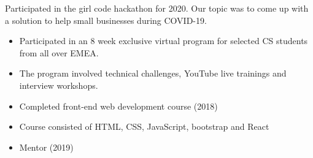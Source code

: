 \documentclass[10pt,a4paper,ragged2e,withhyper]{altacv}
\begin{document}
\begin{paracol}{2}
\divider

Participated in the girl code hackathon for 2020. Our topic was to come up with a solution to help small businesses during COVID-19. 

\divider


\begin{itemize}
    \item Participated in an 8 week exclusive virtual program for selected CS students from all over EMEA.
    \item The program involved technical challenges, YouTube live trainings and interview workshops.
\end{itemize}
\divider

\begin{itemize}
    \item Completed front-end web development course (2018)
    \item Course consisted of HTML, CSS, JavaScript, bootstrap and React
    \item Mentor (2019)
\end{itemize}





{}

\divider

{}

\divider

{}



\end{paracol}
\end{document}
